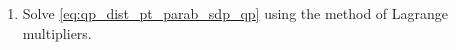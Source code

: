 \begin{enumerate}[label=\arabic*.,ref=\thesection.\theenumi]
\item Solve \eqref{eq:qp_dist_pt_parab_sdp_qp} using the method of Lagrange multipliers.
%
%
%
%	
%
\end{enumerate}
